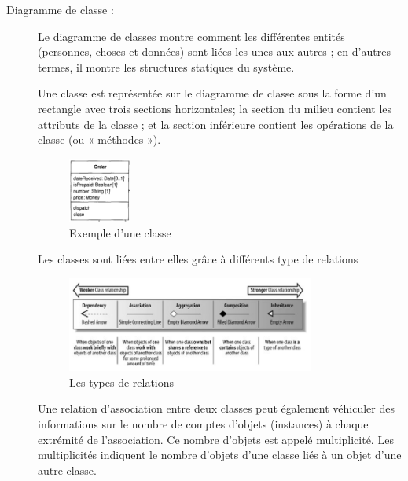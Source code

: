 \documentclass[french]{report}
\begin{document}
\begin{description}
                \item[Diagramme de classe :]
                Le diagramme de classes montre comment les différentes entités (personnes, choses et données)
		sont liées les unes aux autres ; en d'autres termes, il montre les structures statiques du système.\cite{IBM}
                
                Une classe est représentée sur le diagramme de classe sous la forme d'un rectangle avec trois sections
		horizontales; la section du milieu contient les attributs de la classe ;
		et la section inférieure contient les opérations de la classe (ou « méthodes »). \cite{IBM}
                \begin{figure}[!h] 
                    \center 
                    \includegraphics[width=0.2\textwidth,keepaspectratio]{images/class example.png} 
                    \caption{Exemple d'une classe}
                    \label{UML logo}
                \end{figure}
                
                Les classes sont liées entre elles grâce à différents type de relations
                \begin{figure}[!h] 
                    \center 
                    \includegraphics[width=0.8\textwidth,keepaspectratio]{images/diag class relation exemple.png} 
                    \caption{Les types de relations}
                    \label{UML logo}
                \end{figure}
                
                Une relation d'association entre deux classes peut également véhiculer des informations 
		sur le nombre de comptes d'objets (instances) à chaque extrémité de l'association.
		Ce nombre d'objets est appelé multiplicité. Les multiplicités indiquent le nombre d'objets
		d'une classe liés à un objet d'une autre classe.\cite{IBM}
                

\end{description}
\end{document}

